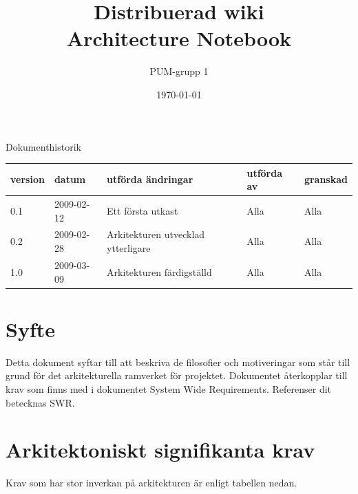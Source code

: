 

\ifpdf
\else
\fi

\title{Distribuerad wiki \\ Architecture Notebook}
\author{PUM-grupp 1}
\date{\today}



\maketitle

\thispagestyle{empty}

\newpage

{\centering \Large{Dokumenthistorik\\}}

\vspace{10pt}
\begin{tabularx}{\textwidth}{ |l|l|X|l|l| }
  \hline
    \textbf{version} & \textbf{datum} & \textbf{utförda ändringar} & \textbf{utförda av} & \textbf{granskad} \\
	\hline 
  0.1 & 2009-02-12 &  Ett första utkast  & Alla & Alla   \\
	\hline 
  0.2 & 2009-02-28 &  Arkitekturen utvecklad ytterligare  & Alla & Alla   \\
	\hline 
  1.0 & 2009-03-09 &  Arkitekturen färdigställd    & Alla & Alla   \\
  \hline
\end{tabularx}

\newpage

\setcounter{tocdepth}{2}
\tableofcontents
\newpage

\section{Syfte}
Detta dokument syftar till att beskriva de filosofier och motiveringar som står till grund för det arkitekturella ramverket för projektet. Dokumentet återkopplar till krav som finns med i dokumentet System Wide Requirements. Referenser dit betecknas SWR.
\section{Arkitektoniskt signifikanta krav}
Krav som har stor inverkan på arkitekturen är enligt tabellen nedan.

